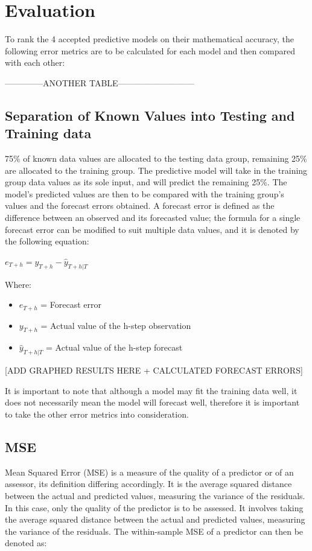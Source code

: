 \documentclass{mcmthesis}
\begin{document}
    \section{Evaluation}
    To rank the 4 accepted predictive models on their mathematical accuracy, the following error metrics are to be calculated for each model and then compared with each other:

    --------------ANOTHER TABLE---------------------------

    \subsection{Separation of Known Values into Testing and Training data}
    75\% of known data values are allocated to the testing data group, remaining 25\% are allocated to the training group. The predictive model will take in the training group data values as its sole input, and will predict the remaining 25\%. The model’s predicted values are then to be compared with the training group’s values and the forecast errors obtained.
    A forecast error is defined as the difference between an observed and its forecasted value; the formula for a single forecast error can be modified to suit multiple data values, and it is denoted by the following equation:
    
    ${e_{T+h} = y_{T+h} - \hat{y}_{T+h|T}}$
    
    Where:
    \begin{itemize}
        \item ${e_{T+h}}$ = Forecast error 
        \item ${y_{T+h}}$ = Actual value of the h-step observation
        \item ${\hat{y}_{T+h|T}}$ = Actual value of the h-step forecast
    \end{itemize}
    
    
    [ADD GRAPHED RESULTS HERE + CALCULATED FORECAST ERRORS]
    
    It is important to note that although a model may fit the training data well, it does not necessarily mean the model will forecast well, therefore it is important to take the other error metrics into consideration.

    \subsection{MSE}
    Mean Squared Error (MSE) is a measure of the quality of a predictor or of an assessor, its definition differing accordingly. It is the average squared distance between the actual and predicted values, measuring the variance of the residuals. In this case, only the quality of the predictor is to be assessed. It involves taking the average squared distance between the actual and predicted values, measuring the variance of the residuals. The within-sample MSE of a predictor can then be denoted as:
\end{document}

